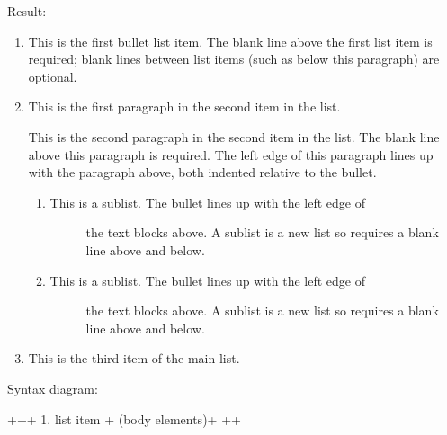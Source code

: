 \documentclass[letterpaper,11pt,english]{sphinxmanual}
\begin{document}
Result:
\begin{enumerate}
\def\theenumi{\arabic{enumi}}
\def\labelenumi{\theenumi .}
\makeatletter\def\p@enumii{\p@enumi \theenumi .}\makeatother
\item {} 
This is the first bullet list item.  The blank line above the
first list item is required; blank lines between list items
(such as below this paragraph) are optional.

\item {} 
This is the first paragraph in the second item in the list.

This is the second paragraph in the second item in the list.
The blank line above this paragraph is required.  The left edge
of this paragraph lines up with the paragraph above, both
indented relative to the bullet.
\begin{enumerate}
\def\theenumii{\alph{enumii}}
\def\labelenumii{\theenumii .}
\makeatletter\def\p@enumiii{\p@enumii \theenumii .}\makeatother
\item {} \begin{description}
\item[{This is a sublist.  The bullet lines up with the left edge of}] \leavevmode
the text blocks above.  A sublist is a new list so requires a
blank line above and below.

\end{description}

\item {} \begin{description}
\item[{This is a sublist.  The bullet lines up with the left edge of}] \leavevmode
the text blocks above.  A sublist is a new list so requires a
blank line above and below.

\end{description}

\end{enumerate}

\item {} 
This is the third item of the main list.

\end{enumerate}

Syntax diagram:

\begin{sphinxVerbatim}[commandchars=\\\{\}]
+\PYGZhy{}\PYGZhy{}\PYGZhy{}\PYGZhy{}\PYGZhy{}\PYGZhy{}\PYGZhy{}+\PYGZhy{}\PYGZhy{}\PYGZhy{}\PYGZhy{}\PYGZhy{}\PYGZhy{}\PYGZhy{}\PYGZhy{}\PYGZhy{}\PYGZhy{}\PYGZhy{}\PYGZhy{}\PYGZhy{}\PYGZhy{}\PYGZhy{}\PYGZhy{}\PYGZhy{}\PYGZhy{}\PYGZhy{}\PYGZhy{}\PYGZhy{}\PYGZhy{}+
 \PYGZdq{}1. \PYGZdq{} \textbar{} list item            \textbar{}
+\PYGZhy{}\PYGZhy{}\PYGZhy{}\PYGZhy{}\PYGZhy{}\PYGZhy{}\PYGZhy{}\textbar{} (body elements)+     \textbar{}
        +\PYGZhy{}\PYGZhy{}\PYGZhy{}\PYGZhy{}\PYGZhy{}\PYGZhy{}\PYGZhy{}\PYGZhy{}\PYGZhy{}\PYGZhy{}\PYGZhy{}\PYGZhy{}\PYGZhy{}\PYGZhy{}\PYGZhy{}\PYGZhy{}\PYGZhy{}\PYGZhy{}\PYGZhy{}\PYGZhy{}\PYGZhy{}\PYGZhy{}+
\end{sphinxVerbatim}
\end{document}
